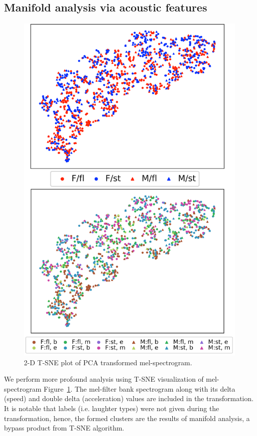 \documentclass[10pt,journal,compsoc]{IEEEtran}
\begin{document}
\subsection{Manifold analysis via acoustic features}
\begin{figure}[!t]
\centering
\includegraphics[width=1\linewidth]{figures/mel_tsne.pdf}
\caption{2-D T-SNE plot of PCA transformed mel-spectrogram.}
\label{fig:tsne}
\end{figure}
We perform more profound analysis using T-SNE visualization of mel-spectrogram Figure~\ref{fig:tsne}. The mel-filter bank spectrogram along with its delta (speed) and double delta (acceleration) values are included in the transformation. It is notable that labels (i.e. laughter types) were not given during the transformation, hence, the formed clusters are the results of manifold analysis, a bypass product from T-SNE algorithm.
\end{document}
